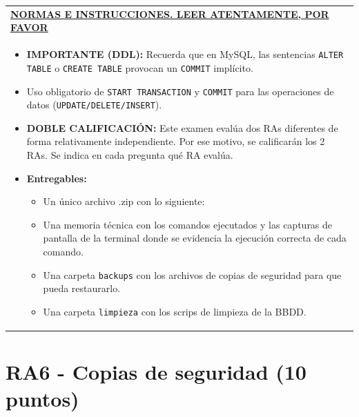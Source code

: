 \documentclass[12pt,a4paper]{article}
\begin{document}
\vspace{0.5cm}

\noindent
\begin{tabularx}{\textwidth}{|X|}
    \hline
    \textbf{\underline{NORMAS E INSTRUCCIONES. LEER ATENTAMENTE, POR FAVOR}} \\
    \begin{itemize}[label=$\blacksquare$, leftmargin=1cm, nosep, after=\vspace{0.2cm}]
        \item \textbf{IMPORTANTE (DDL):} Recuerda que en MySQL, las sentencias \texttt{ALTER TABLE} o \texttt{CREATE TABLE} provocan un \texttt{COMMIT} implícito.
        \item Uso obligatorio de \texttt{START TRANSACTION} y \texttt{COMMIT} para las operaciones de datos (\texttt{UPDATE/DELETE/INSERT}).
        \item \textbf{DOBLE CALIFICACIÓN:} Este examen evalúa dos RAs diferentes de forma relativamente independiente. Por ese motivo, se calificarán los 2 RAs. Se indica en cada pregunta qué RA evalúa.

        \item \textbf{Entregables:}
        \begin{itemize}
        \item Un único archivo .zip con lo siguiente:
        \item Una memoria técnica con los comandos ejecutados y las capturas de pantalla de la terminal donde se evidencia la ejecución correcta de cada comando.
        \item Una carpeta \texttt{backups} con los archivos de copias de seguridad para que pueda restaurarlo.
        \item Una carpeta \texttt{limpieza} con los scrips de limpieza de la BBDD.
        \end{itemize}

    \end{itemize} \\ \hline
\end{tabularx}

\vspace{0.5cm}

\section{RA6 - Copias de seguridad (10 puntos)}
\end{document}
